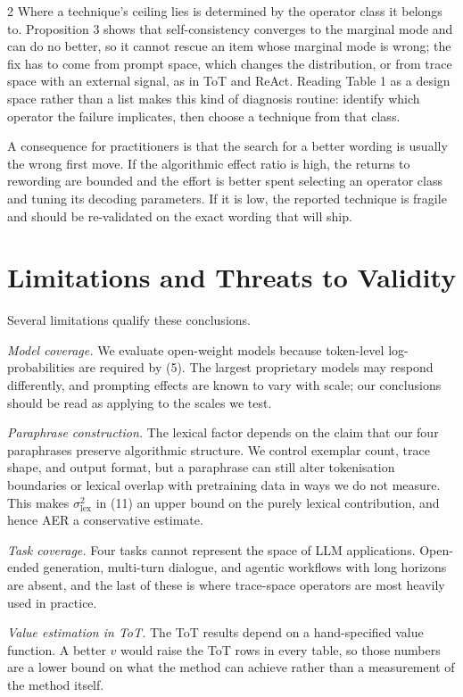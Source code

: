 \documentclass{article}
\begin{document}
\begin{multicols}{2}
Where a technique's ceiling lies is determined by the operator class it belongs to. Proposition 3 shows that self-consistency converges to the marginal mode and can do no better, so it cannot rescue an item whose marginal mode is wrong; the fix has to come from prompt space, which changes the distribution, or from trace space with an external signal, as in ToT and ReAct. Reading Table 1 as a design space rather than a list makes this kind of diagnosis routine: identify which operator the failure implicates, then choose a technique from that class.

A consequence for practitioners is that the search for a better wording is usually the wrong first move. If the algorithmic effect ratio is high, the returns to rewording are bounded and the effort is better spent selecting an operator class and tuning its decoding parameters. If it is low, the reported technique is fragile and should be re-validated on the exact wording that will ship.

\section{Limitations and Threats to Validity}

Several limitations qualify these conclusions.

\textit{Model coverage.} We evaluate open-weight models because token-level log-probabilities are required by (5). The largest proprietary models may respond differently, and prompting effects are known to vary with scale; our conclusions should be read as applying to the scales we test.

\textit{Paraphrase construction.} The lexical factor depends on the claim that our four paraphrases preserve algorithmic structure. We control exemplar count, trace shape, and output format, but a paraphrase can still alter tokenisation boundaries or lexical overlap with pretraining data in ways we do not measure. This makes $\sigma_{\text{lex}}^{2}$ in (11) an upper bound on the purely lexical contribution, and hence AER a conservative estimate.

\textit{Task coverage.} Four tasks cannot represent the space of LLM applications. Open-ended generation, multi-turn dialogue, and agentic workflows with long horizons are absent, and the last of these is where trace-space operators are most heavily used in practice.

\textit{Value estimation in ToT.} The ToT results depend on a hand-specified value function. A better $v$ would raise the ToT rows in every table, so those numbers are a lower bound on what the method can achieve rather than a measurement of the method itself.


\end{multicols}
\end{document}
